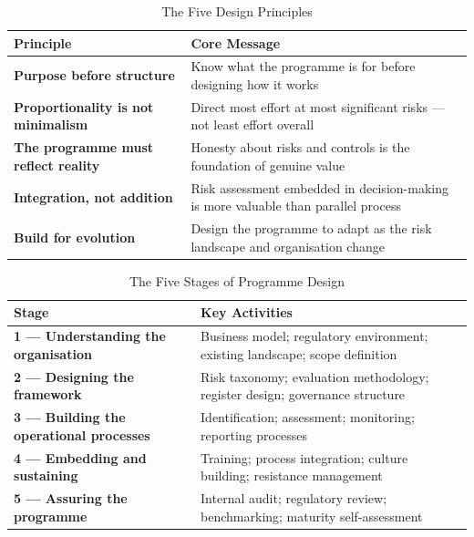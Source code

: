 \begin{table}[H]
  \centering
  \renewcommand{\arraystretch}{1.5}
  \begin{tabularx}{\textwidth}{ | >{\raggedright\arraybackslash}p{} 
                                | >{\raggedright\arraybackslash}X | }
    \hline
    \textbf{Principle} & \textbf{Core Message} \\
    \hline
    \textbf{Purpose before structure} & Know what the programme is for before designing how it works\\
    \hline
    \textbf{Proportionality is not minimalism} & Direct most effort at most significant risks — not least effort overall\\
    \hline
    \textbf{The programme must reflect reality} & Honesty about risks and controls is the foundation of genuine value\\
    \hline
    \textbf{Integration, not addition} & Risk assessment embedded in decision-making is more valuable than parallel process\\
    \hline
    \textbf{Build for evolution} & Design the programme to adapt as the risk landscape and organisation change\\
    \hline
  \end{tabularx}
  \caption{The Five Design Principles}
\end{table}

\begin{table}[H]
  \centering
  \renewcommand{\arraystretch}{1.5}
  \begin{tabularx}{\textwidth}{ | >{\raggedright\arraybackslash}p{} 
                                | >{\raggedright\arraybackslash}X | }
    \hline
    \textbf{Stage} & \textbf{Key Activities} \\
    \hline
    \textbf{1 — Understanding the organisation} & Business model; regulatory environment; existing landscape; scope definition\\
    \hline
    \textbf{2 — Designing the framework} & Risk taxonomy; evaluation methodology; register design; governance structure\\
    \hline
    \textbf{3 — Building the operational processes} & Identification; assessment; monitoring; reporting processes\\
    \hline
    \textbf{4 — Embedding and sustaining} & Training; process integration; culture building; resistance management\\
    \hline
    \textbf{5 — Assuring the programme} & Internal audit; regulatory review; benchmarking; maturity self-assessment\\
    \hline
  \end{tabularx}
  \caption{The Five Stages of Programme Design}
\end{table}

